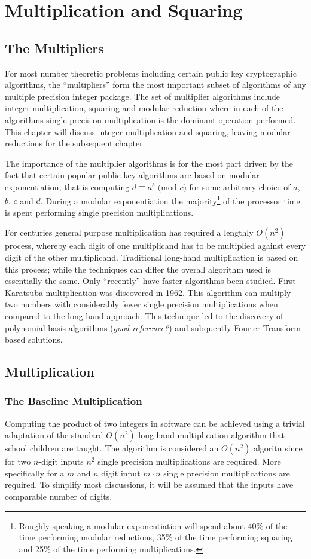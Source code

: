 \documentclass[b5paper]{book}
\begin{document}
\chapter{Multiplication and Squaring}
\section{The Multipliers}
For most number theoretic problems including certain public key cryptographic algorithms, the ``multipliers'' form the most important subset of 
algorithms of any multiple precision integer package.  The set of multiplier algorithms include integer multiplication, squaring and modular reduction 
where in each of the algorithms single precision multiplication is the dominant operation performed.  This chapter will discuss integer multiplication 
and squaring, leaving modular reductions for the subsequent chapter.  

The importance of the multiplier algorithms is for the most part driven by the fact that certain popular public key algorithms are based on modular 
exponentiation, that is computing $d \equiv a^b \mbox{ (mod }c\mbox{)}$ for some arbitrary choice of $a$, $b$, $c$ and $d$.  During a modular
exponentiation the majority\footnote{Roughly speaking a modular exponentiation will spend about 40\% of the time performing modular reductions, 
35\% of the time performing squaring and 25\% of the time performing multiplications.} of the processor time is spent performing single precision 
multiplications.

For centuries general purpose multiplication has required a lengthly $O(n^2)$ process, whereby each digit of one multiplicand has to be multiplied 
against every digit of the other multiplicand.  Traditional long-hand multiplication is based on this process;  while the techniques can differ the 
overall algorithm used is essentially the same.  Only ``recently'' have faster algorithms been studied.  First Karatsuba multiplication was discovered in 
1962.  This algorithm can multiply two numbers with considerably fewer single precision multiplications when compared to the long-hand approach.  
This technique led to the discovery of polynomial basis algorithms (\textit{good reference?}) and subquently Fourier Transform based solutions.  

\section{Multiplication}
\subsection{The Baseline Multiplication}
Computing the product of two integers in software can be achieved using a trivial adaptation of the standard $O(n^2)$ long-hand multiplication
algorithm that school children are taught.  The algorithm is considered an $O(n^2)$ algoritn since for two $n$-digit inputs $n^2$ single precision 
multiplications are required.  More specifically for a $m$ and $n$ digit input $m \cdot n$ single precision multiplications are required.  To 
simplify most discussions, it will be assumed that the inputs have comparable number of digits.  
\end{document}
